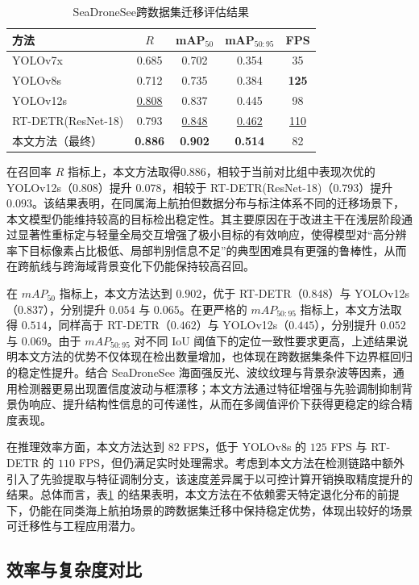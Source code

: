 \begin{table}[!htbp]
\centering
\caption{SeaDroneSee跨数据集迁移评估结果}
\label{tab:seadronesee_cmp}
\begin{tabular}{l c c c c}
\hline
方法 & $R$ & mAP$_{50}$ & mAP$_{50:95}$ & FPS \\
\hline
YOLOv7x & 0.685 & 0.702 & 0.354 & 35 \\
YOLOv8s & 0.712 & 0.735 & 0.384 & \textbf{125} \\
YOLOv12s & \underline{0.808} & 0.837 & 0.445 & 98 \\
RT-DETR(ResNet-18) & 0.793 & \underline{0.848} & \underline{0.462} & \underline{110} \\
本文方法（最终） & \textbf{0.886} & \textbf{0.902} & \textbf{0.514} & 82 \\
\hline
\end{tabular}
\end{table}
在召回率 $R$ 指标上，本文方法取得0.886，相较于当前对比组中表现次优的 YOLOv12s（0.808）提升 $0.078$，相较于 RT-DETR(ResNet-18)（$0.793$）提升 $0.093$。该结果表明，在同属海上航拍但数据分布与标注体系不同的迁移场景下，本文模型仍能维持较高的目标检出稳定性。其主要原因在于改进主干在浅层阶段通过显著性重标定与轻量全局交互增强了极小目标的有效响应，使得模型对“高分辨率下目标像素占比极低、局部判别信息不足”的典型困难具有更强的鲁棒性，从而在跨航线与跨海域背景变化下仍能保持较高召回。

在 $mAP_{50}$ 指标上，本文方法达到 $0.902$，优于 RT-DETR（$0.848$）与 YOLOv12s（$0.837$），分别提升 $0.054$ 与 $0.065$。在更严格的 $mAP_{50:95}$ 指标上，本文方法取得 $0.514$，同样高于 RT-DETR（$0.462$）与 YOLOv12s（$0.445$），分别提升 $0.052$ 与 $0.069$。由于 $mAP_{50:95}$ 对不同 IoU 阈值下的定位一致性要求更高，上述结果说明本文方法的优势不仅体现在检出数量增加，也体现在跨数据集条件下边界框回归的稳定性提升。结合 SeaDroneSee 海面强反光、波纹纹理与背景杂波等因素，通用检测器更易出现置信度波动与框漂移；本文方法通过特征增强与先验调制抑制背景伪响应、提升结构性信息的可传递性，从而在多阈值评价下获得更稳定的综合精度表现。

在推理效率方面，本文方法达到 $82$ FPS，低于 YOLOv8s 的 $125$ FPS 与 RT-DETR 的 $110$ FPS，但仍满足实时处理需求。考虑到本文方法在检测链路中额外引入了先验提取与特征调制分支，该速度差异属于以可控计算开销换取精度提升的结果。总体而言，表\ref{tab:seadronesee_cmp} 的结果表明，本文方法在不依赖雾天特定退化分布的前提下，仍能在同类海上航拍场景的跨数据集迁移中保持稳定优势，体现出较好的场景可迁移性与工程应用潜力。


\subsection{效率与复杂度对比}
\label{subsec:efficiency_cmp}

